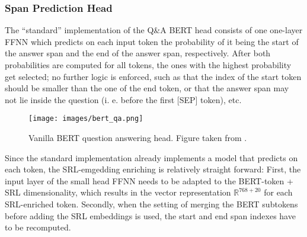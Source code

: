 \subsubsection{Span Prediction Head}

The ``standard'' implementation of the Q\&A BERT head consists of one one-layer FFNN which predicts
on each input token the probability of it being the start of the answer span and the end of the
answer span, respectively. After both probabilities are computed for all tokens, the ones with
the highest probability get selected; no further logic is enforced, such as that the index of
the start token should be smaller than the one of the end token, or that the answer span may
not lie inside the question (i. e. before the first [SEP] token), etc.

\begin{wrapfigure}[21]{r}{0.45\linewidth}
  \begin{center}
    \texttt{[image: images/bert\_qa.png]}
  \end{center}
  \caption[BERT Q\&A]{Vanilla BERT question answering head. Figure taken from \citep{devlin2018bert}.}
\end{wrapfigure}

Since the standard implementation already implements a model that predicts on each token,
the SRL-emgedding enriching is relatively straight forward:
First, the input layer of the small head FFNN needs to be adapted to the BERT-token + SRL
dimensionality, which results in the vector representation $\mathbb{R}^{768+20}$ for each
SRL-enriched token. Secondly, when the setting of merging the BERT subtokens before adding
the SRL embeddings is used, the start and end span indexes have to be recomputed.





